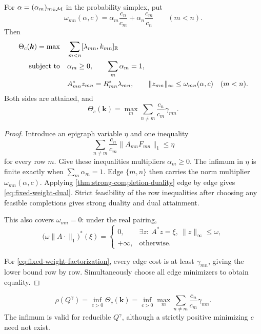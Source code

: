 \begin{theorem}
\label{thm:fixed-weight-dual}
For
\(\alpha=(\alpha_m)_{m\in\mathcal M}\) in the probability simplex, put
\[
 \omega_{mn}(\alpha,c)
 =
 \alpha_m\frac{c_n}{c_m}
 +
 \alpha_n\frac{c_m}{c_n}
 \qquad(m<n).
\]
Then
\begin{align}
 \Theta_c(\boldsymbol k)
 =
 \max\quad&
 \sum_{m<n}[\lambda_{mn},k_{mn}]_{\mathbb R}
 \label{eq:fixed-weight-dual}\\
 \textup{subject to}\quad&
 \alpha_m\ge0,\qquad\sum_m\alpha_m=1,\notag\\
 &
 A_{mn}^*z_{mn}=R_{mn}^*\lambda_{mn},
 \qquad
 \|z_{mn}\|_\infty
 \le\omega_{mn}(\alpha,c)
 \quad(m<n).\notag
\end{align}
Both sides are attained, and
\begin{equation}
 \Theta_c(\boldsymbol k)
 =
 \max_m\sum_{n\ne m}\frac{c_n}{c_m}\gamma_{mn}.
 \label{eq:fixed-weight-factorization}
\end{equation}
\end{theorem}

\begin{proof}
Introduce an epigraph variable \(\eta\) and one inequality
\[
 \sum_{n\ne m}\frac{c_n}{c_m}\|A_{mn}F_{mn}\|_1
 \le\eta
\]
for every row \(m\).  Give these inequalities multipliers
\(\alpha_m\ge0\).  The infimum in \(\eta\) is finite exactly when
\(\sum_m\alpha_m=1\).  Edge \(\{m,n\}\) then carries the norm multiplier
\(\omega_{mn}(\alpha,c)\).  Applying
\cref{thm:strong-completion-duality} edge by edge gives
\eqref{eq:fixed-weight-dual}.  Strict feasibility of the row inequalities
after choosing any feasible completions gives strong duality and dual
attainment.

This also covers \(\omega_{mn}=0\): under the real pairing,
\[
 \bigl(\omega\|A\cdot\|_1\bigr)^*(\xi)
 =
 \begin{cases}
  0,&\exists z:\ A^*z=\xi,\ \|z\|_\infty\le\omega,\\
  +\infty,&\text{otherwise}.
 \end{cases}
\]

For \eqref{eq:fixed-weight-factorization}, every edge cost is at least
\(\gamma_{mn}\), giving the lower bound row by row.  Simultaneously choose
all edge minimizers to obtain equality.
\end{proof}

\begin{corollary}
\label{cor:Collatz-reduction}
\[
 \rho(Q^\gamma)
 =
 \inf_{c>0}\Theta_c(\boldsymbol k)
 =
 \inf_{c>0}
 \max_m\sum_{n\ne m}\frac{c_n}{c_m}\gamma_{mn}.
\]
The infimum is valid for reducible \(Q^\gamma\), although a strictly
positive minimizing \(c\) need not exist.
\end{corollary}

